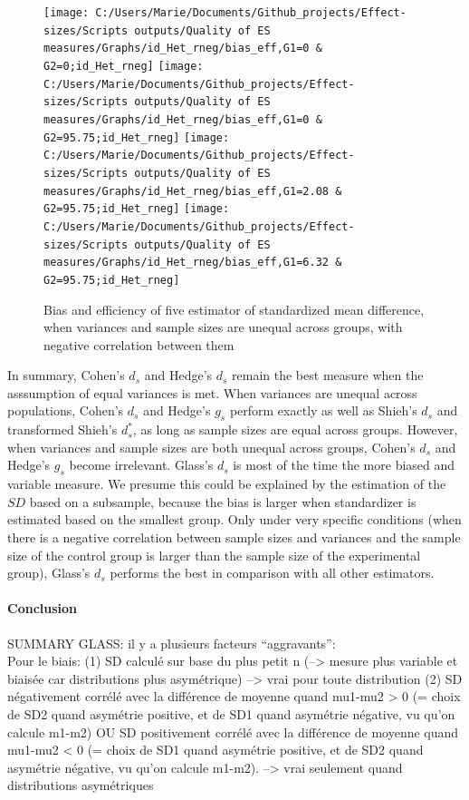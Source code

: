 \documentclass[
  man,floatsintext]{apa6}
\begin{document}
\begin{figure}

{\centering \texttt{[image: C:/Users/Marie/Documents/Github\_projects/Effect-sizes/Scripts outputs/Quality of ES measures/Graphs/id\_Het\_rneg/bias\_eff,G1=0 \& G2=0;id\_Het\_rneg]} \texttt{[image: C:/Users/Marie/Documents/Github\_projects/Effect-sizes/Scripts outputs/Quality of ES measures/Graphs/id\_Het\_rneg/bias\_eff,G1=0 \& G2=95.75;id\_Het\_rneg]} \texttt{[image: C:/Users/Marie/Documents/Github\_projects/Effect-sizes/Scripts outputs/Quality of ES measures/Graphs/id\_Het\_rneg/bias\_eff,G1=2.08 \& G2=95.75;id\_Het\_rneg]} \texttt{[image: C:/Users/Marie/Documents/Github\_projects/Effect-sizes/Scripts outputs/Quality of ES measures/Graphs/id\_Het\_rneg/bias\_eff,G1=6.32 \& G2=95.75;id\_Het\_rneg]} 

}

\caption{Bias and efficiency of five estimator of standardized mean difference, when variances and sample sizes are unequal across groups, with negative correlation between them}\label{fig:idHetrneg}
\end{figure}

In summary, Cohen's \(d_s\) and Hedge's \(d_s\) remain the best measure when the asssumption of equal variances is met. When variances are unequal across populations, Cohen's \(d_s\) and Hedge's \(g_s\) perform exactly as well as Shieh's \(d_s\) and transformed Shieh's \(d^*_s\), as long as sample sizes are equal across groups. However, when variances and sample sizes are both unequal across groups, Cohen's \(d_s\) and Hedge's \(g_s\) become irrelevant. Glass's \(d_s\) is most of the time the more biased and variable measure. We presume this could be explained by the estimation of the \(SD\) based on a subsample, because the bias is larger when standardizer is estimated based on the smallest group. Only under very specific conditions (when there is a negative correlation between sample sizes and variances and the sample size of the control group is larger than the sample size of the experimental group), Glass's \(d_s\) performs the best in comparison with all other estimators.

\hypertarget{conclusion}{%
\paragraph{Conclusion}\label{conclusion}}

SUMMARY GLASS: il y a plusieurs facteurs \enquote{aggravants}:\\
Pour le biais:
(1) SD calculé sur base du plus petit n (--\textgreater{} mesure plus variable et biaisée car distributions plus asymétrique) --\textgreater{} vrai pour toute distribution
(2) SD négativement corrélé avec la différence de moyenne quand mu1-mu2 \textgreater{} 0 (= choix de SD2 quand asymétrie positive, et de SD1 quand asymétrie négative, vu qu'on calcule m1-m2) OU SD positivement corrélé avec la différence de moyenne quand mu1-mu2 \textless{} 0 (= choix de SD1 quand asymétrie positive, et de SD2 quand asymétrie négative, vu qu'on calcule m1-m2). --\textgreater{} vrai seulement quand distributions asymétriques
\end{document}
